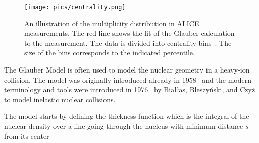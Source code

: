 \begin{figure}[tb]
\centering

               \texttt{[image: pics/centrality.png]}
        \caption[An illustration of the multiplicity distribution in ALICE measurement with centrality classes.]{An illustration of the multiplicity distribution in ALICE measurements. The red line shows
the fit of the Glauber calculation to the measurement. The data is divided into centrality bins~\cite{PhysRevC.88.044909}. The size of the bins corresponds to the indicated percentile.}
        	\label{fig:centrality}
\end{figure}





The Glauber Model is often used to model the nuclear geometry in a heavy-ion collision. The model was originally introduced already in 1958~\cite{Glauber:1959} and the modern terminology and tools were introduced in 1976~\cite{Biallas1976461} by Białłas, Bleszyński, and Czyż to model inelastic nuclear collisions.

The model starts by defining the thickness function which is the integral of the nuclear density over a line going through the nucleus with minimum distance $s$ from its center

